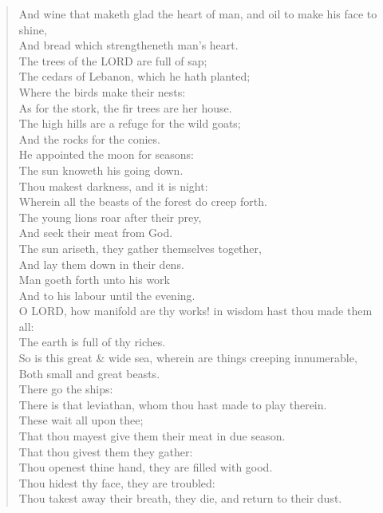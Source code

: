\documentclass[MAIN]{subfiles}
\begin{document}
\begin{verse}
And wine that maketh glad the heart of man, and oil to make his face to shine,\\
\vin And bread which strengtheneth man's heart.\\
The trees of the {\hge LORD} are full of sap;\\
\vin The cedars of Lebanon, which he hath planted;\\
Where the birds make their nests:\\
\vin As for the stork, the fir trees are her house.\\
The high hills are a refuge for the wild goats;\\
\vin And the rocks for the conies.\\
He appointed the moon for seasons:\\
\vin The sun knoweth his going down.\\
Thou makest darkness, and it is night:\\
\vin Wherein all the beasts of the forest do creep forth.\\
The young lions roar after their prey,\\
\vin And seek their meat from God.\\
The sun ariseth, they gather themselves together,\\
\vin And lay them down in their dens.\\
Man goeth forth unto his work\\
\vin And to his labour until the evening.\\
O {\hge LORD}, how manifold are thy works! in wisdom hast thou made them all:\\
\vin The earth is full of thy riches.\\
So is this great \& wide sea, wherein are things creeping innumerable,\\
\vin Both small and great beasts.\\
There go the ships:\\
\vin There is that leviathan, whom thou hast made to play therein.\\
These wait all upon thee;\\
\vin That thou mayest give them their meat in due season.\\
That thou givest them they gather:\\
\vin Thou openest thine hand, they are filled with good.\\
Thou hidest thy face, they are troubled:\\
\vin Thou takest away their breath, they die, and return to their dust.\\

\end{verse}
\end{document}
